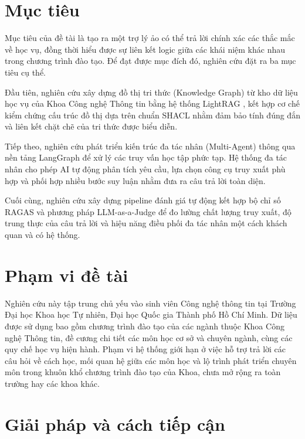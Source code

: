 \section{Mục tiêu}

Mục tiêu của đề tài là tạo ra một trợ lý ảo có thể trả lời chính xác các thắc mắc về học vụ, đồng thời hiểu được sự liên kết logic giữa các khái niệm khác nhau trong chương trình đào tạo. Để đạt được mục đích đó, nghiên cứu đặt ra ba mục tiêu cụ thể.

Đầu tiên, nghiên cứu xây dựng đồ thị tri thức (Knowledge Graph) từ kho dữ liệu học vụ của Khoa Công nghệ Thông tin bằng hệ thống LightRAG \cite{guo2025lightrag}, kết hợp cơ chế kiểm chứng cấu trúc đồ thị dựa trên chuẩn SHACL \cite{shacl_w3c} nhằm đảm bảo tính đúng đắn và liên kết chặt chẽ của tri thức được biểu diễn.

Tiếp theo, nghiên cứu phát triển kiến trúc đa tác nhân (Multi-Agent) thông qua nền tảng LangGraph \cite{langgraph2024} để xử lý các truy vấn học tập phức tạp. Hệ thống đa tác nhân cho phép AI tự động phân tích yêu cầu, lựa chọn công cụ truy xuất phù hợp và phối hợp nhiều bước suy luận nhằm đưa ra câu trả lời toàn diện.

Cuối cùng, nghiên cứu xây dựng pipeline đánh giá tự động kết hợp bộ chỉ số RAGAS \cite{es2023ragas} và phương pháp LLM-as-a-Judge \cite{zheng2023judging} để đo lường chất lượng truy xuất, độ trung thực của câu trả lời và hiệu năng điều phối đa tác nhân một cách khách quan và có hệ thống.

\section{Phạm vi đề tài}

Nghiên cứu này tập trung chủ yếu vào sinh viên Công nghệ thông tin tại Trường Đại học Khoa học Tự nhiên, Đại học Quốc gia Thành phố Hồ Chí Minh. Dữ liệu được sử dụng bao gồm chương trình đào tạo của các ngành thuộc Khoa Công nghệ Thông tin, đề cương chi tiết các môn học cơ sở và chuyên ngành, cùng các quy chế học vụ hiện hành. Phạm vi hệ thống giới hạn ở việc hỗ trợ trả lời các câu hỏi về cách học, mối quan hệ giữa các môn học và lộ trình phát triển chuyên môn trong khuôn khổ chương trình đào tạo của Khoa, chưa mở rộng ra toàn trường hay các khoa khác.

\section{Giải pháp và cách tiếp cận}

